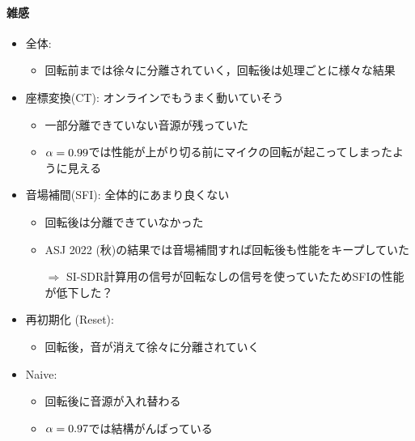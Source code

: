 \documentclass[sip,biber]{now-journal}
\begin{document}
\paragraph{雑感}
\begin{itemize}
  \item 全体:
    \begin{itemize}
      \item 回転前までは徐々に分離されていく，回転後は処理ごとに様々な結果
    \end{itemize}
  \item 座標変換(CT): オンラインでもうまく動いていそう
    \begin{itemize}
      \item 一部分離できていない音源が残っていた
      \item $\alpha=0.99$では性能が上がり切る前にマイクの回転が起こってしまったように見える
    \end{itemize}
  \item 音場補間(SFI): 全体的にあまり良くない
    \begin{itemize}
      \item 回転後は分離できていなかった
      \item ASJ 2022 (秋)の結果では音場補間すれば回転後も性能をキープしていた
      \item[$\Rightarrow$] SI-SDR計算用の信号が回転なしの信号を使っていたためSFIの性能が低下した？
    \end{itemize}
  \item 再初期化 (Reset):
    \begin{itemize}
      \item 回転後，音が消えて徐々に分離されていく
    \end{itemize}
  \item Naive:
    \begin{itemize}
      \item 回転後に音源が入れ替わる
      \item $\alpha=0.97$では結構がんばっている
    \end{itemize}
\end{itemize}
\end{document}
